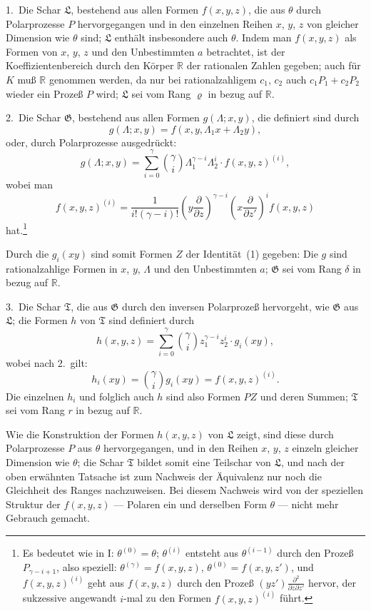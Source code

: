 \documentclass[12pt,a4paper]{article}
\newcommand{\bR}{\mathbb{R}}
\begin{document}
1.\ Die Schar $\mathfrak{L}$, bestehend aus allen Formen $f(x, y, z)$, die aus $\theta$ durch Polarprozesse $P$ hervorgegangen und in den einzelnen Reihen $x$, $y$, $z$ von gleicher Dimension wie $\theta$ sind; $\mathfrak{L}$ enth\"alt insbesondere auch $\theta$. Indem man $f(x, y, z)$ als Formen von $x$, $y$, $z$ und den Unbestimmten $a$ betrachtet, ist der Koeffizientenbereich durch den K\"orper $\bR$ der rationalen Zahlen gegeben; auch f\"ur $K$ mu\ss{} $\bR$ genommen werden, da nur bei rationalzahligem $c_1$, $c_2$ auch $c_1P_1 + c_2P_2$ wieder ein Proze\ss{} $P$ wird; $\mathfrak{L}$ sei vom Rang $\varrho$ in bezug auf $\bR$.

2.\ Die Schar $\mathfrak{G}$, bestehend aus allen Formen $g(\Lambda; x, y)$, die definiert sind durch
\[
g(\Lambda; x, y) = f(x, y, \Lambda_1 x + \Lambda_2 y),
\]
oder, durch Polarprozesse ausgedr\"uckt:
\[
g(\Lambda; x, y) = \sum_{i=0}^{\gamma} \binom{\gamma}{i} \Lambda_1^{\gamma-i} \Lambda_2^i \cdot f(x, y, z)^{(i)},
\]
wobei man
\[
f(x, y, z)^{(i)} = \frac{1}{i!(\gamma-i)!} \left(y \frac{\partial}{\partial z}\right)^{\gamma-i} \left(x \frac{\partial}{\partial z'}\right)^i f(x, y, z)
\]
hat.\footnote{Es bedeutet wie in I: $\theta^{(0)} = \theta$; $\theta^{(i)}$ entsteht aus $\theta^{(i-1)}$ durch den Proze\ss{} $P_{\gamma-i+1}$, also speziell: $\theta^{(\gamma)} = f(x, y, z)$, $\theta^{(0)} = f(x, y, z')$, und $f(x, y, z)^{(i)}$ geht aus $f(x, y, z)$ durch den Proze\ss{} $(yz') \frac{\partial^2}{\partial z \partial z'}$ hervor, der sukzessive angewandt $i$-mal zu den Formen $f(x, y, z)^{(i)}$ f\"uhrt.}

Durch die $g_i(xy)$ sind somit Formen $Z$ der Identit\"at~(1) gegeben: Die $g$ sind rationalzahlige Formen in $x$, $y$, $\Lambda$ und den Unbestimmten $a$; $\mathfrak{G}$ sei vom Rang $\delta$ in bezug auf $\bR$.

3.\ Die Schar $\mathfrak{T}$, die aus $\mathfrak{G}$ durch den inversen Polarproze\ss{} hervorgeht, wie $\mathfrak{G}$ aus $\mathfrak{L}$; die Formen $h$ von $\mathfrak{T}$ sind definiert durch
\[
h(x, y, z) = \sum_{i=0}^{\gamma} \binom{\gamma}{i} z_1^{\gamma-i} z_2^i \cdot g_i(xy),
\]
wobei nach 2.\ gilt:
\[
h_i(xy) = \binom{\gamma}{i} g_i(xy) = f(x, y, z)^{(i)}.
\]
Die einzelnen $h_i$ und folglich auch $h$ sind also Formen $PZ$ und deren Summen; $\mathfrak{T}$ sei vom Rang $r$ in bezug auf $\bR$.

Wie die Konstruktion der Formen $h(x, y, z)$ von $\mathfrak{L}$ zeigt, sind diese durch Polarprozesse $P$ aus $\theta$ hervorgegangen, und in den Reihen $x$, $y$, $z$ einzeln gleicher Dimension wie $\theta$; die Schar $\mathfrak{T}$ bildet somit eine Teilschar von $\mathfrak{L}$, und nach der oben erw\"ahnten Tatsache ist zum Nachweis der Äquivalenz nur noch die Gleichheit des Ranges nachzuweisen. Bei diesem Nachweis wird von der speziellen Struktur der $f(x, y, z)$ --- Polaren ein und derselben Form $\theta$ --- nicht mehr Gebrauch gemacht.
\end{document}
